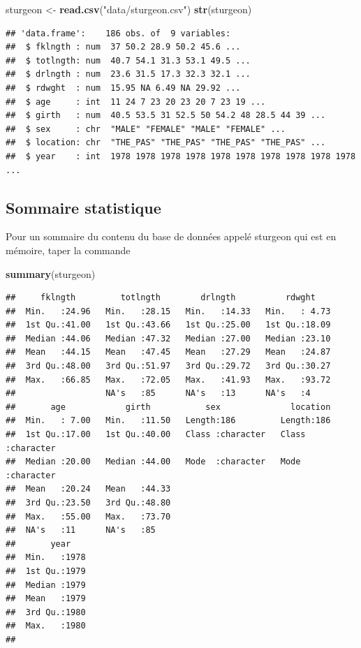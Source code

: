 \documentclass[12pt,]{book}
\newenvironment{Shaded}{\begin{snugshade}}{\end{snugshade}}
\newcommand{\KeywordTok}[1]{\textcolor[rgb]{0.27,0.27,0.27}{\textbf{#1}}}
\newcommand{\NormalTok}[1]{#1}
\newcommand{\StringTok}[1]{\textcolor[rgb]{0.5,0.5,0.5}{#1}}
\begin{document}
\begin{Shaded}
\begin{Highlighting}[]
\NormalTok{sturgeon <-}\StringTok{ }\KeywordTok{read.csv}\NormalTok{(}\StringTok{"data/sturgeon.csv"}\NormalTok{)}
\KeywordTok{str}\NormalTok{(sturgeon)}
\end{Highlighting}
\end{Shaded}

\begin{verbatim}
## 'data.frame':	186 obs. of  9 variables:
##  $ fklngth : num  37 50.2 28.9 50.2 45.6 ...
##  $ totlngth: num  40.7 54.1 31.3 53.1 49.5 ...
##  $ drlngth : num  23.6 31.5 17.3 32.3 32.1 ...
##  $ rdwght  : num  15.95 NA 6.49 NA 29.92 ...
##  $ age     : int  11 24 7 23 20 23 20 7 23 19 ...
##  $ girth   : num  40.5 53.5 31 52.5 50 54.2 48 28.5 44 39 ...
##  $ sex     : chr  "MALE" "FEMALE" "MALE" "FEMALE" ...
##  $ location: chr  "THE_PAS" "THE_PAS" "THE_PAS" "THE_PAS" ...
##  $ year    : int  1978 1978 1978 1978 1978 1978 1978 1978 1978 1978 ...
\end{verbatim}

\hypertarget{sommaire-statistique}{%
\subsection{Sommaire statistique}\label{sommaire-statistique}}

Pour un sommaire du contenu du base de données appelé sturgeon qui est en mémoire, taper la commande

\begin{Shaded}
\begin{Highlighting}[]
\KeywordTok{summary}\NormalTok{(sturgeon)}
\end{Highlighting}
\end{Shaded}

\begin{verbatim}
##     fklngth         totlngth        drlngth          rdwght     
##  Min.   :24.96   Min.   :28.15   Min.   :14.33   Min.   : 4.73  
##  1st Qu.:41.00   1st Qu.:43.66   1st Qu.:25.00   1st Qu.:18.09  
##  Median :44.06   Median :47.32   Median :27.00   Median :23.10  
##  Mean   :44.15   Mean   :47.45   Mean   :27.29   Mean   :24.87  
##  3rd Qu.:48.00   3rd Qu.:51.97   3rd Qu.:29.72   3rd Qu.:30.27  
##  Max.   :66.85   Max.   :72.05   Max.   :41.93   Max.   :93.72  
##                  NA's   :85      NA's   :13      NA's   :4      
##       age            girth           sex              location        
##  Min.   : 7.00   Min.   :11.50   Length:186         Length:186        
##  1st Qu.:17.00   1st Qu.:40.00   Class :character   Class :character  
##  Median :20.00   Median :44.00   Mode  :character   Mode  :character  
##  Mean   :20.24   Mean   :44.33                                        
##  3rd Qu.:23.50   3rd Qu.:48.80                                        
##  Max.   :55.00   Max.   :73.70                                        
##  NA's   :11      NA's   :85                                           
##       year     
##  Min.   :1978  
##  1st Qu.:1979  
##  Median :1979  
##  Mean   :1979  
##  3rd Qu.:1980  
##  Max.   :1980  
## 
\end{verbatim}
\end{document}
